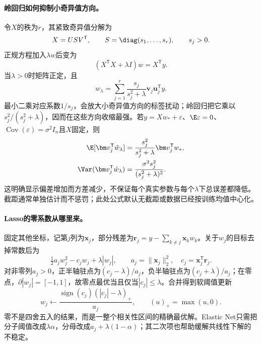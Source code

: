 \paragraph{岭回归如何抑制小奇异值方向。}
令$X$的秩为$r$，其紧致奇异值分解为
\begin{equation}
 X=USV^{\mathsf T},\qquad S=\diag(s_1,\ldots,s_r),\qquad s_j>0.
\end{equation}
正规方程加入$\lambda w$后变为
\begin{equation}
 (X^{\mathsf T}X+\lambda I)w=X^{\mathsf T}y.
\end{equation}
当$\lambda>0$时矩阵正定，且
\begin{equation}
 \hat w_\lambda=\sum_{j=1}^r\frac{s_j}{s_j^2+\lambda}\bm v_j\bm u_j^{\mathsf T}y.
\end{equation}
最小二乘对应系数$1/s_j$，会放大小奇异值方向的标签扰动；岭回归把它乘以$s_j^2/(s_j^2+\lambda)$，因而在这些方向收缩最强。若$y=Xw_*+\varepsilon$、$\E\varepsilon=0$、$\operatorname{Cov}(\varepsilon)=\sigma^2I_n$且$X$固定，则
\begin{align}
 \E[\bm v_j^{\mathsf T}\hat w_\lambda]
 &=\frac{s_j^2}{s_j^2+\lambda}\bm v_j^{\mathsf T}w_*,\\
 \Var(\bm v_j^{\mathsf T}\hat w_\lambda)
 &=\frac{\sigma^2s_j^2}{(s_j^2+\lambda)^2}.
\end{align}
这明确显示偏差增加而方差减少，不保证每个真实参数与每个$\lambda$下总误差都降低。截距通常单独估计而不惩罚；此处公式默认无截距或数据已经按训练均值中心化。

\paragraph{Lasso的零系数从哪里来。}
固定其他坐标，记第$j$列为$\bm x_j$，部分残差为$\bm r_j=y-\sum_{k\ne j}\bm x_kw_k$。关于$w_j$的目标去掉常数后为
\begin{equation}
 \tfrac12a_jw_j^2-c_jw_j+\lambda|w_j|,\qquad
 a_j=\|\bm x_j\|_2^2,\quad c_j=\bm x_j^{\mathsf T}\bm r_j.
\end{equation}
对非零列$a_j>0$，正半轴驻点为$(c_j-\lambda)/a_j$，负半轴驻点为$(c_j+\lambda)/a_j$；在零点，$\partial|w_j|=[-1,1]$，故零点最优当且仅当$|c_j|\leq\lambda$。合并得到软阈值更新
\begin{equation}
 w_j\leftarrow\frac{\operatorname{sign}(c_j)(|c_j|-\lambda)_+}{a_j},
 \qquad (u)_+=\max(u,0).
\end{equation}
零不是四舍五入的结果，而是一整个相关性区间的精确最优解。Elastic Net只需把分子阈值改成$\lambda\alpha$，分母改成$a_j+\lambda(1-\alpha)$；其二次项也帮助缓解共线性下解的不稳定。

